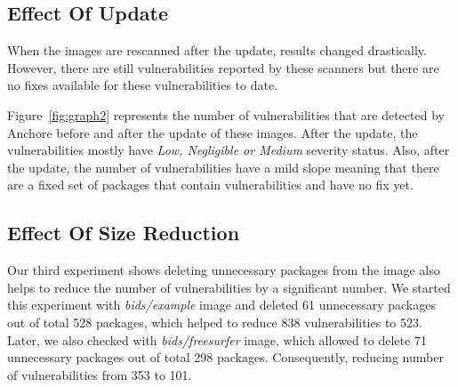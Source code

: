 \documentclass[a4paper,num-refs]{oup-contemporary}
\begin{document}
\subsection{Effect Of Update}

When the images are rescanned after the update, results changed drastically. However, there are still
vulnerabilities reported by these scanners but there are no fixes available for these vulnerabilities
to date.

Figure~\ref{fig:graph2} represents the number of vulnerabilities that are detected by Anchore before and after 
the update of these images.
After the update, the vulnerabilities mostly have \textit{Low, Negligible or Medium} severity status.
Also, after the update, the number of vulnerabilities have a mild slope meaning that there
are a fixed set of packages that contain vulnerabilities and have no fix yet.

\subsection{Effect Of Size Reduction}

Our third experiment shows deleting unnecessary packages from the image also helps to reduce
the number of vulnerabilities by a significant number. We started this experiment with
\textit{bids/example} image and deleted 61 unnecessary packages out of total 528 packages, which helped
to reduce 838 vulnerabilities to 523. Later, we also checked with \textit{bids/freesurfer} image, which allowed
to delete 71 unnecessary packages out of total 298 packages. Consequently, reducing number of vulnerabilities
from 353 to 101.
\end{document}
